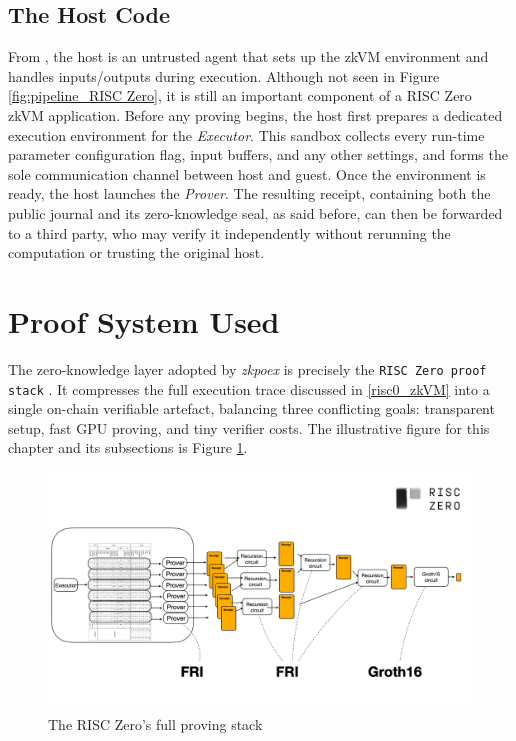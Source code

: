 \subsection{The Host Code}\makeatletter{}\makeatother
\label{hostcode}

From \cite{risc0_host}, the host is an untrusted agent that sets up the zkVM environment and handles inputs/outputs during execution. Although not seen in Figure \ref{fig:pipeline_RISC Zero}, it is still an important component of a RISC Zero zkVM application. Before any proving begins, the host first prepares a dedicated execution environment for the \textit{Executor}.  This sandbox collects every run-time parameter configuration flag, input buffers, and any other settings, and forms the sole communication channel between host and guest. Once the environment is ready, the host launches the \textit{Prover}. The resulting receipt, containing both the public journal and its zero-knowledge seal, as said before, can then be forwarded to a third party, who may verify it independently without rerunning the computation or trusting the original host.

\section{Proof System Used}\label{proof_system}

The zero-knowledge layer adopted by \textit{zkpoex} is precisely the
\texttt{RISC Zero proof stack} \cite{risc0_proving_stack}.
It compresses the full execution trace discussed in
\ref{risc0_zkVM} into a single on-chain verifiable artefact, balancing three
conflicting goals: transparent setup, fast GPU proving, and tiny verifier
costs. The illustrative figure for this chapter and its subsections is Figure \ref{fig:proving_stack}. 

\begin{figure}[h]
    \centering
    \includegraphics[width=1\linewidth]{Images/Chap2/proofStackRisc0.png}
    \caption{The RISC Zero's full proving stack \cite{risc0_proving_stack}}
    \label{fig:proving_stack}
\end{figure}


